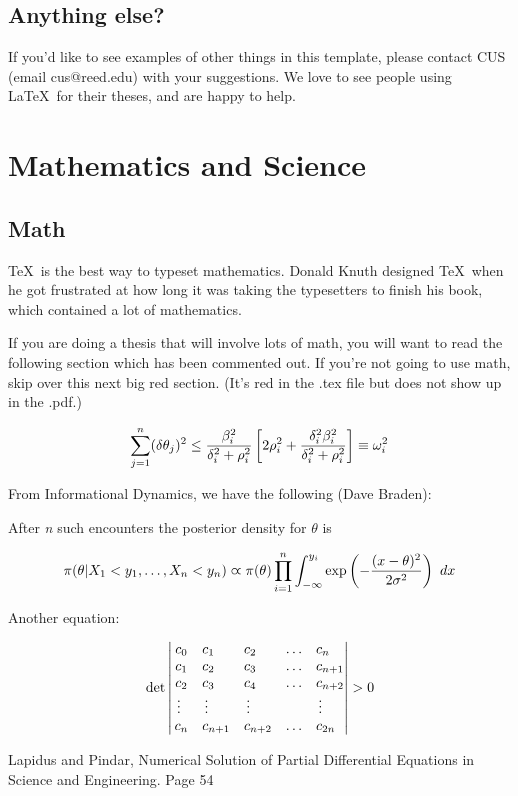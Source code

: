 \documentclass[12pt,twoside]{reedthesis}
\begin{document}
\section{Anything else?}
If you'd like to see examples of other things in this template, please contact CUS (email cus@reed.edu) with your suggestions. We love to see people using \LaTeX\ for their theses, and are happy to help.


\chapter{Mathematics and Science}	
\section{Math}
	\TeX\ is the best way to typeset mathematics. Donald Knuth designed \TeX\ when he got frustrated at how long it was taking the typesetters to finish his book, which contained a lot of mathematics. 
	
	If you are doing a thesis that will involve lots of math, you will want to read the following section which has been commented out. If you're not going to use math, skip over this next big red section. (It's red in the .tex file but does not show up in the .pdf.)
	
	$$\sum_{j=1}^n (\delta\theta_j)^2 \leq {{\beta_i^2}\over{\delta_i^2 + \rho_i^2}}
\left[ 2\rho_i^2 + {\delta_i^2\beta_i^2\over{\delta_i^2 + \rho_i^2}} \right] \equiv \omega_i^2
$$

From Informational Dynamics, we have the following (Dave Braden):

After {\it n} such encounters the posterior density for $\theta$ is

$$
\pi(\theta|X_1< y_1,\dots,X_n<y_n) \varpropto \pi(\theta) \prod_{i=1}^n\int_{-\infty}^{y_i}
   \exp\left(-{(x-\theta)^2\over{2\sigma^2}}\right)\ dx
$$



Another equation:

$$\det\left|\,\begin{matrix}%
c_0&c_1\hfill&c_2\hfill&\ldots&c_n\hfill\cr
c_1&c_2\hfill&c_3\hfill&\ldots&c_{n+1}\hfill\cr
c_2&c_3\hfill&c_4\hfill&\ldots&c_{n+2}\hfill\cr
\,\vdots\hfill&\,\vdots\hfill&
  \,\vdots\hfill&&\,\vdots\hfill\cr
c_n&c_{n+1}\hfill&c_{n+2}\hfill&\ldots&c_{2n}\hfill\cr
\end{matrix}\right|>0$$


Lapidus and Pindar, Numerical Solution of Partial Differential Equations in Science and
Engineering.  Page 54
\end{document}
